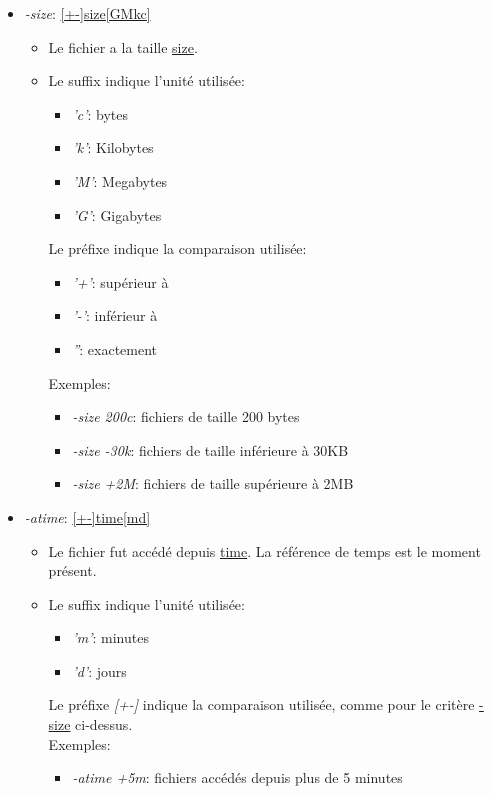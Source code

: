 \documentclass[11pt, a4paper]{article}
\begin{document}
\begin{itemize}
\begin{itemize}
	\end{itemize}
	\item \textit{-size}: \underline{[+-]size[GMkc]}
	\begin{itemize}
		\item 		Le fichier a la taille \underline{size}.
		\item 		Le suffix indique l'unité utilisée:
		\begin{itemize}
			\item \textit{'c'}: bytes
			\item \textit{'k'}: Kilobytes
			\item \textit{'M'}: Megabytes
			\item \textit{'G'}: Gigabytes
		\end{itemize}
		Le préfixe indique la comparaison utilisée:
		\begin{itemize}
			\item \textit{'+'}: supérieur à
			\item \textit{'-'}: inférieur à
			\item \textit{''}: exactement
		\end{itemize}
		Exemples:
		\begin{itemize}
			\item \textit{-size 200c}: fichiers de taille 200 bytes		
			\item \textit{-size -30k}: fichiers de taille inférieure à 30KB
			\item \textit{-size +2M}: fichiers de taille supérieure à 2MB
		\end{itemize}
	\end{itemize}
	\item \textit{-atime}: \underline{[+-]time[md]}
	\begin{itemize}
		\item	Le fichier fut accédé depuis \underline{time}. La référence de temps est le moment présent.
		\item	Le suffix indique l'unité utilisée:
		\begin{itemize}
			\item \textit{'m'}: minutes
			\item \textit{'d'}: jours 
		\end{itemize}
		Le préfixe \textit{[+-]} indique la comparaison utilisée, comme pour le critère \underline{-size} ci-dessus.\\
		Exemples:
		\begin{itemize}
			\item \textit{-atime +5m}: fichiers accédés depuis plus de 5 minutes

\end{itemize}
\end{itemize}
\end{itemize}
\end{document}
